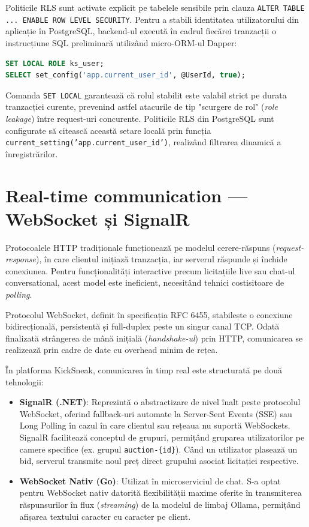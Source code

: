 Politicile RLS sunt activate explicit pe tabelele sensibile prin clauza \texttt{ALTER TABLE ... ENABLE ROW LEVEL SECURITY}. Pentru a stabili identitatea utilizatorului din aplicație în PostgreSQL, backend-ul execută în cadrul fiecărei tranzacții o instrucțiune SQL preliminară utilizând micro-ORM-ul Dapper:
\begin{lstlisting}[language=SQL]
SET LOCAL ROLE ks_user;
SELECT set_config('app.current_user_id', @UserId, true);
\end{lstlisting}

Comanda \texttt{SET LOCAL} garantează că rolul stabilit este valabil strict pe durata tranzacției curente, prevenind astfel atacurile de tip "scurgere de rol" (\textit{role leakage}) între request-uri concurente. Politicile RLS din PostgreSQL sunt configurate să citească această setare locală prin funcția \texttt{current\_setting('app.current\_user\_id')}, realizând filtrarea dinamică a înregistrărilor.

\section{Real-time communication --- WebSocket și SignalR}

Protocoalele HTTP tradiționale funcționează pe modelul cerere-răspuns (\textit{request-response}), în care clientul inițiază tranzacția, iar serverul răspunde și închide conexiunea. Pentru funcționalități interactive precum licitațiile live sau chat-ul conversational, acest model este ineficient, necesitând tehnici costisitoare de \textit{polling}.

Protocolul WebSocket, definit în specificația RFC 6455, stabilește o conexiune bidirecțională, persistentă și full-duplex peste un singur canal TCP. Odată finalizată strângerea de mână inițială (\textit{handshake-ul}) prin HTTP, comunicarea se realizează prin cadre de date cu overhead minim de rețea.

În platforma KickSneak, comunicarea în timp real este structurată pe două tehnologii:
\begin{itemize}
    \item \textbf{SignalR (.NET)}: Reprezintă o abstractizare de nivel înalt peste protocolul WebSocket, oferind fallback-uri automate la Server-Sent Events (SSE) sau Long Polling în cazul în care clientul sau rețeaua nu suportă WebSockets. SignalR facilitează conceptul de grupuri, permițând gruparea utilizatorilor pe camere specifice (ex. grupul \texttt{auction-\{id\}}). Când un utilizator plasează un bid, serverul transmite noul preț direct grupului asociat licitației respective.
    \item \textbf{WebSocket Nativ (Go)}: Utilizat în microserviciul de chat. S-a optat pentru WebSocket nativ datorită flexibilității maxime oferite în transmiterea răspunsurilor în flux (\textit{streaming}) de la modelul de limbaj Ollama, permițând afișarea textului caracter cu caracter pe client.
\end{itemize}

